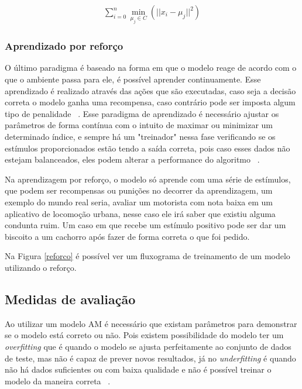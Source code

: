           \begin{equation}\label{kmeans}
            \begin{aligned}
              \sum_{i=0}^{n}\min_{\mu_j \in C}(||x_i - \mu_j||^2)
          \end{aligned} 
          \end{equation}



    \subsubsection{Aprendizado por reforço}

          O último paradigma é baseado na forma em que o modelo reage de acordo com o que o ambiente passa para ele, é possível aprender
          continuamente. Esse aprendizado é realizado através das ações que são executadas, caso seja a decisão correta o modelo ganha uma recompensa, caso
          contrário pode ser imposta algum tipo de penalidade ~\cite{zurada}. Esse paradigma de aprendizado é necessário ajustar os parâmetros de forma
          contínua com o intuito de maximar ou minimizar um determinado índice, e sempre há um "treinador" nessa fase verificando se os estímulos proporcionados
          estão tendo a saída correta, pois caso esses dados não estejam balanceados, eles podem alterar a performance do algoritmo ~\cite{mazurowski2008training}.


          Na aprendizagem por reforço, o modelo só aprende com uma série de estímulos, que podem ser recompensas ou punições no decorrer da aprendizagem, 
          um exemplo do mundo real seria, avaliar um motorista com nota baixa em um aplicativo de locomoção urbana, nesse caso ele irá saber que existiu
          alguma condunta ruim. Um caso em que recebe um estímulo positivo pode ser dar um biscoito a um cachorro após fazer de forma correta o que foi pedido.

          Na Figura \ref{reforco} é possível ver um fluxograma de treinamento de um modelo utilizando o reforço.


  \subsection{Medidas de avaliação}
          Ao utilizar um modelo \acrshort{AM} é necessário que existam parâmetros para demonstrar se o modelo está correto ou não. Pois existem 
          possibilidade do modelo ter um \textit{overfitting} que é quando o modelo se ajusta perfeitamente ao conjunto de dados de teste, mas não é capaz
          de prever novos resultados, já no \textit{underfitting} é quando não há dados suficientes ou com baixa qualidade e não é possível treinar o modelo 
          da maneira correta ~\cite{van2010process}.
          
